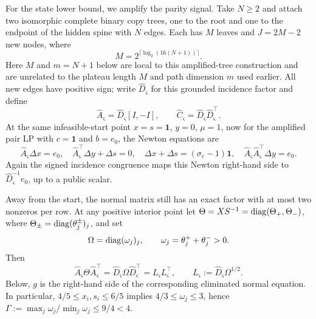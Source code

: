For the state lower bound, we amplify the parity signal.  Take $N\geq2$ and
attach two isomorphic complete
binary copy trees, one to the root and one to the endpoint of the hidden
spine with $N$ edges.  Each has $M$ leaves and $J=2M-2$ new nodes, where
\begin{equation}
 M=2^{\lceil\log_2(16(N+1))\rceil}.                       \label{eq:prec-two-tree-size}
\end{equation}
Here $M$ and $m=N+1$ below are local to this amplified-tree construction and
are unrelated to the plateau length $M$ and path dimension $m$ used earlier.
All new edges have positive sign; write $\widehat D_\varsigma$ for this
grounded incidence factor and define
\begin{equation}
 \widehat A_\varsigma=\widehat D_\varsigma[I,-I],\qquad
 \widehat C_\varsigma=\widehat D_\varsigma\widehat D_\varsigma^\top.
 \label{eq:prec-amplified-normal}
\end{equation}
At the same infeasible-start point $x=s=\mathbf1$, $y=0$, $\mu=1$, now for
the amplified pair LP with $c=\mathbf1$ and $b=e_0$, the Newton equations are
\begin{equation}
 \widehat A_\varsigma\Delta x=e_0,\quad
 \widehat A_\varsigma^\top\Delta y+\Delta s=0,\quad
 \Delta x+\Delta s=(\sigma_c-1)\mathbf1,\quad
 \widehat A_\varsigma\widehat A_\varsigma^\top\Delta y=e_0.
 \label{eq:prec-amplified-newton}
\end{equation}
Again the signed incidence congruence maps this Newton right-hand side to
$\widehat D_\varsigma^{-1}e_0$, up to a public scalar.

Away from the start, the normal matrix still has an exact factor with at most
two nonzeros per row.  At any positive interior point let
$\Theta=XS^{-1}=\operatorname{diag}(\Theta_+,\Theta_-)$, where
$\Theta_\pm=\operatorname{diag}(\theta_j^\pm)_j$, and set
\begin{equation}
 \Omega=\operatorname{diag}(\omega_j)_j,\qquad
 \omega_j=\theta^+_j+\theta^-_j>0.                       \label{eq:prec-local-omega}
\end{equation}
Then
\begin{equation}
 \widehat A_\varsigma\Theta\widehat A_\varsigma^\top
 =\widehat D_\varsigma\Omega\widehat D_\varsigma^\top
 =L_\varsigma L_\varsigma^\top,\qquad
 L_\varsigma:=\widehat D_\varsigma\Omega^{1/2}.         \label{eq:prec-local-factor}
\end{equation}
Below, $g$ is the right-hand side of the corresponding eliminated normal
equation.  In particular,
$4/5\leq x_i,s_i\leq6/5$ implies
$4/3\leq\omega_j\leq3$, hence
$\Gamma:=\max_j\omega_j/\min_j\omega_j\leq9/4<4$.


